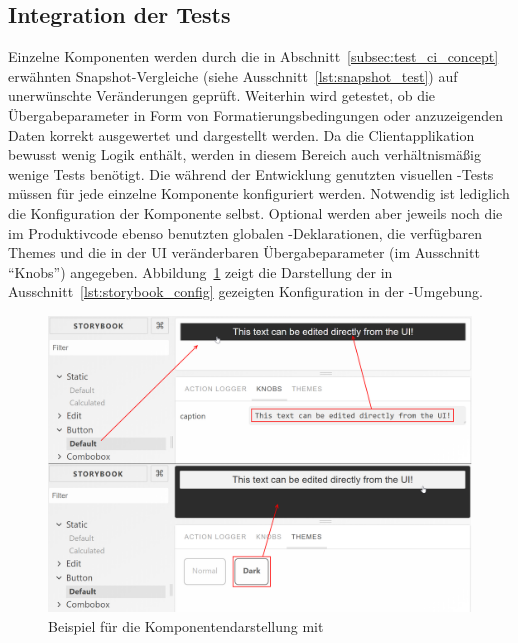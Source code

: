 \subsection{Integration der Tests}
Einzelne Komponenten werden durch die in Abschnitt~\ref{subsec:test_ci_concept} erwähnten Snapshot-Vergleiche (siehe Ausschnitt~\ref{lst:snapshot_test}) auf unerwünschte Veränderungen geprüft. Weiterhin wird getestet, ob die Übergabeparameter in Form von Formatierungsbedingungen oder anzuzeigenden Daten korrekt ausgewertet und dargestellt werden. Da die Clientapplikation bewusst wenig Logik enthält, werden in diesem Bereich auch verhältnismäßig wenige Tests benötigt.
Die während der Entwicklung genutzten visuellen -Tests müssen für jede einzelne Komponente konfiguriert werden. Notwendig ist lediglich die Konfiguration der Komponente selbst. Optional werden aber jeweils noch die im Produktivcode ebenso benutzten globalen -Deklarationen, die verfügbaren Themes und die in der UI veränderbaren Übergabeparameter (im Ausschnitt \enquote{Knobs}) angegeben. Abbildung~\ref{fig:storybook_example} zeigt die Darstellung der in Ausschnitt~\ref{lst:storybook_config} gezeigten Konfiguration in der -Umgebung.





\begin{figure}
    \centering
    \captionsetup{justification=centering}
    \includegraphics[width=\textwidth]{figures/storybook_example.png}
        \caption{Beispiel für die Komponentendarstellung mit }\label{fig:storybook_example}
\end{figure}

